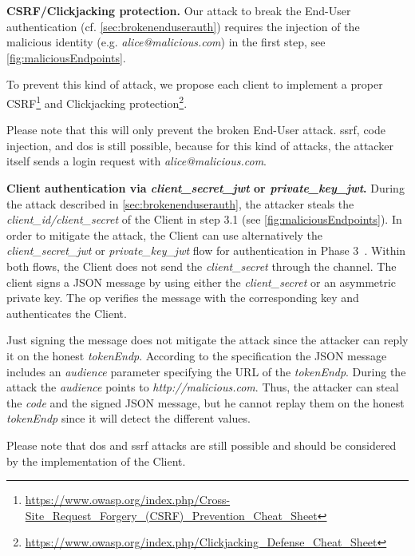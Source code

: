 \documentclass[conference,compsoc]{IEEEtran}
\renewcommand*{\paragraph}[1]{\vspace{2mm}\noindent\textbf{#1.}}
\begin{document}
\paragraph{CSRF/Clickjacking protection}
Our attack to break the End-User authentication (cf. \autoref{sec:brokenenduserauth}) requires the injection of the malicious identity (e.g. \emph{alice@malicious.com}) in the first step, see \autoref{fig:maliciousEndpoints}.

To prevent this kind of attack, we propose each client to implement a proper CSRF\footnote{\url{https://www.owasp.org/index.php/Cross-Site_Request_Forgery_(CSRF)_Prevention_Cheat_Sheet}} and Clickjacking protection\footnote{\url{https://www.owasp.org/index.php/Clickjacking_Defense_Cheat_Sheet}}.

Please note that this will only prevent the broken End-User attack.
\gls{ssrf}, code injection, and \gls{dos} is still possible, because for this kind of attacks, the attacker itself sends a login request with \emph{alice@malicious.com}.

\paragraph{Client authentication via \emph{client\_secret\_jwt} or \emph{private\_key\_jwt}}
During the attack described in \autoref{sec:brokenenduserauth}, the attacker steals the \emph{client\_id/client\_secret} of the Client in step 3.1 (see \autoref{fig:maliciousEndpoints}). 
In order to mitigate the attack, the Client can use alternatively the \emph{client\_secret\_jwt} or \emph{private\_key\_jwt} flow for authentication in Phase 3~\cite[Section 9]{OpenIDFoundation2014}. 
Within both flows, the Client does not send the \emph{client\_secret} through the channel.
The client signs a JSON message by using either the \emph{client\_secret} or an asymmetric private key.  The \gls{op} verifies the message with the corresponding key and authenticates the Client.

Just signing the message does not mitigate the attack since the attacker can reply it on the honest \emph{tokenEndp}.
According to the specification the JSON message includes an \emph{audience} parameter specifying the URL of the \emph{tokenEndp}. 
During the attack the \emph{audience} points to \emph{http://malicious.com}.
Thus, the attacker can steal the \emph{code} and the signed JSON message, but he cannot replay them on the honest \emph{tokenEndp} since it will detect the different values.

Please note that \gls{dos} and \gls{ssrf} attacks are still possible and should be considered by the implementation of the Client.
\end{document}
